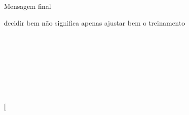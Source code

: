 \documentclass[aspectratio=169,10pt]{beamer}
\begin{document}
\begin{frame}

{Mensagem final}

{decidir bem não significa apenas ajustar bem o treinamento}



\begin{center}



\vspace{0.35cm}



\\[

\boxed{

\text{Decisão sob incerteza}

}

\\]



\\[

\Downarrow

\\]



\\[

\boxed{

\text{Linear Decision Rules}

}

\\]



\\[

\Downarrow

\\]



\\[

\boxed{

\text{Regularização}

}

\\]



\\[

\Downarrow

\\]



\\[

\boxed{

}
\end{center}
\end{frame}
\end{document}
